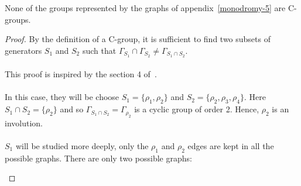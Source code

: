 \begin{theorem}
  \label{exclude-2}
  None of the groups represented by the graphs of appendix~\ref{monodromy-5} are C-groups.
\end{theorem}

\begin{proof}
  By the definition of a C-group, it is sufficient to find two subsets of generators $S_1$ and $S_2$ such that $\Gamma_{S_1} \cap \Gamma_{S_2} \neq \Gamma_{S_1 \cap S_2}$.

  \paragraph{}
  This proof is inspired by the section 4 of~\cite{leemansTransactions}.

  \paragraph{}
  In this case, they will be choose $S_1 = \{\rho_1, \rho_2\}$ and $S_2 = \{\rho_2, \rho_3, \rho_4\}$. Here $S_1 \cap S_2 = \{\rho_2\}$ and so $\Gamma_{S_1 \cap S_2} = \Gamma_{\rho_2}$ is a cyclic group of order 2. Hence, $\rho_2$ is an involution.

  \paragraph{}
  $S_1$ will be studied more deeply, only the $\rho_1$ and $\rho_2$ edges are kept in all the possible graphs. There are only two possible graphs:

  \begin{figure}[H]
    \begin{center}
\end{center}
\end{figure}
\end{proof}
